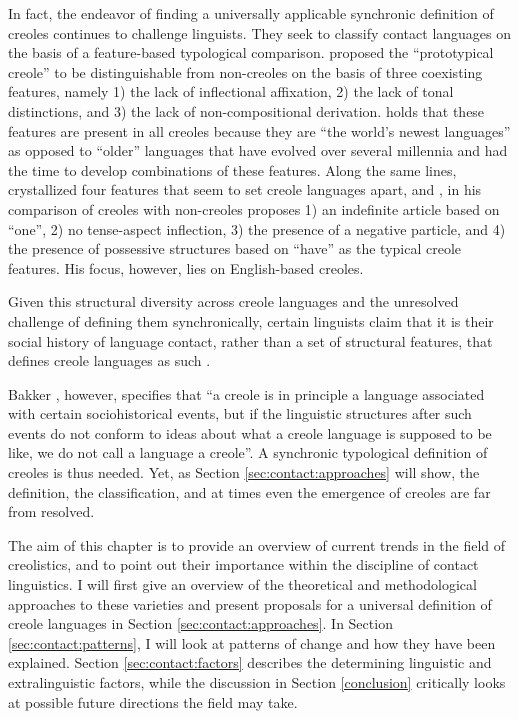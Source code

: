 \documentclass[output=paper]{langscibook}
\begin{document}
In fact, the endeavor of finding a universally applicable synchronic definition of creoles continues to challenge linguists. They seek to classify contact languages on the basis of a feature-based typological comparison. \textcite{mcworther1998identifying, mcworther2005defining} proposed the “prototypical creole” to be distinguishable from non-creoles on the basis of three coexisting features, namely 1) the lack of inflectional affixation, 2) the lack of tonal distinctions, and 3) the lack of non-compositional derivation. \textcite[5]{mcworther2005defining} holds that these features are present in all creoles because they are “the world’s newest languages” as opposed to “older” languages that have evolved over several millennia and had the time to develop combinations of these features. Along the same lines, \textcite{bakkeretal2013creoles} crystallized four features that seem to set creole languages apart, and \textcite[14]{daval2014first}, in his comparison of creoles with non-creoles proposes 1) an indefinite article based on “one”, 2) no tense-aspect inflection, 3) the presence of a negative particle, and 4) the presence of possessive structures based on “have” as the typical creole features. His focus, however, lies on English-based creoles.

Given this structural diversity across creole languages and the unresolved challenge of defining them synchronically, certain linguists claim that it is their social history of language contact, rather than a set of structural features, that defines creole languages as such \citep[cf.][]{mufwene2000creolization, chaudenson2001creolization, mufwene2001ecology, degraff2005linguists, mufwene2008language}.

Bakker \parencite[15]{bakker2017key}, however, specifies that “a creole is in principle a language associated with certain sociohistorical events, but if the linguistic structures after such events do not conform to ideas about what a creole language is supposed to be like, we do not call a language a creole”. A synchronic typological definition of creoles is thus needed. Yet, as Section \ref{sec:contact:approaches} will show, the definition, the classification, and at times even the emergence of creoles are far from resolved.
	
The aim of this chapter is to provide an overview of current trends in the field of creolistics, and to point out their importance within the discipline of contact linguistics. I will first give an overview of the theoretical and methodological approaches to these varieties and present proposals for a universal definition of creole languages in Section \ref{sec:contact:approaches}. In Section \ref{sec:contact:patterns}, I will look at patterns of change and how they have been explained. Section \ref{sec:contact:factors} describes the determining linguistic and extralinguistic factors, while the discussion in Section \ref{conclusion} critically looks at possible future directions the field may take.
\end{document}
